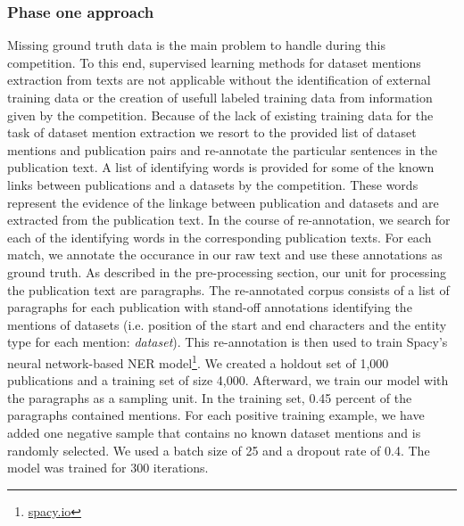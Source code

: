 \subsubsection{Phase one approach}
Missing ground truth data is the main problem to handle during this competition.
To this end, supervised learning methods for dataset mentions extraction from texts are not applicable without the identification of external training data or the creation of usefull labeled training data from information given by the competition.
Because of the lack of existing training data for the task of dataset mention extraction we resort to the provided list of dataset mentions and publication pairs and re-annotate the particular sentences in the publication text.
A list of identifying words is provided for some of the known links between publications and a datasets by the competition.
These words represent the evidence of the linkage between publication and datasets and are extracted from the publication text.
In the course of re-annotation, we search for each of the identifying words in the corresponding publication texts.
For each match, we annotate the occurance in our raw text and use these annotations as ground truth.
As described in the pre-processing section, our unit for processing the publication text are paragraphs.
The re-annotated corpus consists of a list of paragraphs for each publication with stand-off annotations identifying the mentions of datasets (i.e. position of the start and end characters and the entity type for each mention: \emph{dataset}).
This re-annotation is then used to train Spacy's neural network-based NER model\footnote{\url{spacy.io}}.
We created a holdout set of 1,000 publications and a training set of size 4,000.
Afterward, we train our model with the paragraphs as a sampling unit.
In the training set, 0.45 percent of the paragraphs contained mentions.
For each positive training example, we have added one negative sample that contains no known dataset mentions and is randomly selected.   
We used a batch size of 25 and a dropout rate of 0.4.
The model was trained for 300 iterations.
